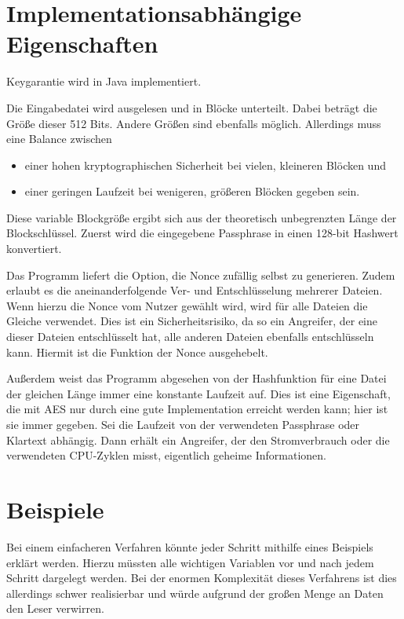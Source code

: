 \documentclass[10pt,a4paper]{article}
\begin{document}
\section{Implementationsabhängige Eigenschaften}

Keygarantie wird in Java implementiert.

Die Eingabedatei wird ausgelesen und in Blöcke unterteilt.
Dabei beträgt die Größe dieser 512 Bits.
Andere Größen sind ebenfalls möglich.
Allerdings muss eine Balance zwischen
\begin{itemize}
    \item einer hohen kryptographischen Sicherheit bei vielen, kleineren Blöcken und
    \item einer geringen Laufzeit bei wenigeren, größeren Blöcken gegeben sein.
\end{itemize}

Diese variable Blockgröße ergibt sich aus der theoretisch unbegrenzten Länge der Blockschlüssel.
Zuerst wird die eingegebene Passphrase in einen 128-bit Hashwert konvertiert.

Das Programm liefert die Option, die Nonce zufällig selbst zu generieren.
Zudem erlaubt es die aneinanderfolgende Ver- und Entschlüsselung mehrerer Dateien.
Wenn hierzu die Nonce vom Nutzer gewählt wird, wird für alle Dateien die Gleiche verwendet.
Dies ist ein Sicherheitsrisiko, da so ein Angreifer, der eine dieser Dateien entschlüsselt hat, alle anderen Dateien ebenfalls entschlüsseln kann.
Hiermit ist die Funktion der Nonce ausgehebelt.

Außerdem weist das Programm abgesehen von der Hashfunktion für eine Datei der gleichen Länge immer eine konstante Laufzeit auf.
Dies ist eine Eigenschaft, die mit AES nur durch eine gute Implementation erreicht werden kann\cite{Pitchaiah2012}; hier ist sie immer gegeben.
Sei die Laufzeit von der verwendeten Passphrase oder Klartext abhängig.
Dann erhält ein Angreifer, der den Stromverbrauch oder die verwendeten CPU-Zyklen misst, eigentlich geheime Informationen.

\section{Beispiele}

Bei einem einfacheren Verfahren könnte jeder Schritt mithilfe eines Beispiels erklärt werden.
Hierzu müssten alle wichtigen Variablen vor und nach jedem Schritt dargelegt werden.
Bei der enormen Komplexität dieses Verfahrens ist dies allerdings schwer realisierbar und würde aufgrund der großen Menge an Daten den Leser verwirren.
\end{document}
